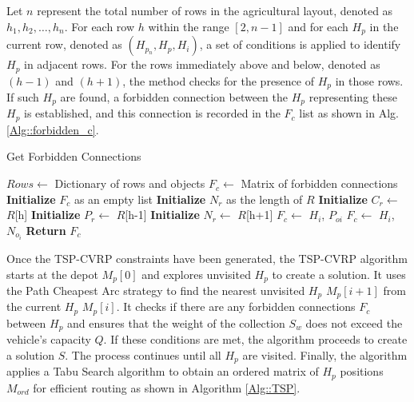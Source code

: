 \documentclass[conference]{IEEEtran}
\begin{document}
Let $n$ represent the total number of rows in the agricultural layout, denoted as $h_{1}, h_{2}, \ldots, h_{n}$. For each row $h$ within the range $[2, n-1]$ and for each $H_{p}$ in the current row, denoted as $(H_{p_{n}}, H_{p}, H_{i})$, a set of conditions is applied to identify $H_{p}$ in adjacent rows. For the rows immediately above and below, denoted as $(h-1)$ and $(h+1)$, the method checks for the presence of $H_{p}$ in those rows. If such $H_{p}$ are found, a forbidden connection between the $H_{p}$ representing these $H_{p}$ is established, and this connection is recorded in the $F_{c}$ list as shown in Alg. \ref{Alg::forbidden_c}.

\begin{algorithm}[t!]
\caption{Get Forbidden Connections}
\label{Alg::forbidden_c}
\begin{algorithmic}[1]
\Require
\State $Rows \gets$ Dictionary of rows and objects
\State $F_{c} \gets$ Matrix of forbidden connections
\Ensure
\State \textbf{Initialize} $F_{c}$ as an empty list
\State \textbf{Initialize} $N_{r}$ as the length of $R$
    \State \textbf{Initialize} $C_{r} \gets$ $R$[h] 
    \State \textbf{Initialize} $P_{r} \gets$ $R$[h-1] 
    \State \textbf{Initialize} $N_{r} \gets$ $R$[h+1] 
             
                    \State $F_{c} \gets$ $H_{i}$, $P_{oi}$ 
                \EndFor
            \EndIf
                    \State $F_{c} \gets$ $H_{i}$, $N_{o_{i}}$
                \EndFor
            \EndIf
        \EndIf
    \EndFor
\EndFor
\State \textbf{Return} $F_{c}$
\end{algorithmic}
\end{algorithm}

Once the TSP-CVRP constraints have been generated, the TSP-CVRP algorithm starts at the depot $M_{p}[0]$ and explores unvisited $H_{p}$ to create a solution. It uses the Path Cheapest Arc strategy to find the nearest unvisited $H_{p}$  $M_{p}[i+1]$ from the current $H_{p}$  $M_{p}[i]$. It checks if there are any forbidden connections $F_{c}$ between $H_{p}$ and ensures that the weight of the collection $S_{w}$ does not exceed the vehicle's capacity $Q$. If these conditions are met, the algorithm proceeds to create a solution $S$. The process continues until all $H_{p}$ are visited. Finally, the algorithm applies a Tabu Search algorithm to obtain an ordered matrix of $H_{p}$ positions $M_{ord}$ for efficient routing as shown in Algorithm \ref{Alg::TSP}.
\end{document}
